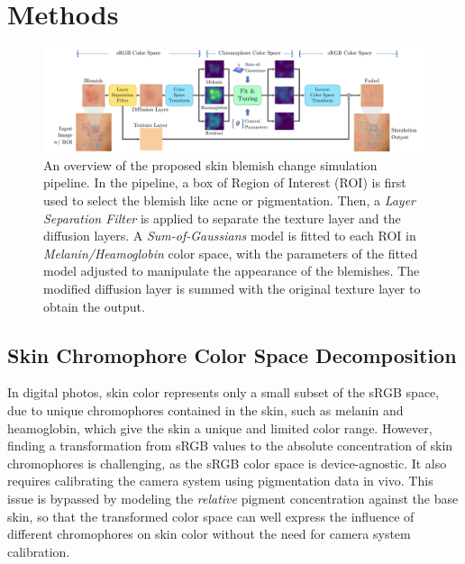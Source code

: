 
\chapter{Methods}
\begin{spacing}{1.5}
\setlength{\parskip}{0.3in}
\begin{figure}[t]
    \centering
    \includegraphics[width=0.94\columnwidth]{Chapter3/system.pdf}
    \caption{An overview of the proposed skin blemish change simulation pipeline. In the pipeline, a box of Region of Interest (ROI) is first used to select the blemish like acne or pigmentation. Then, a \textit{Layer Separation Filter} is applied to separate the texture layer and the diffusion layers. A \textit{Sum-of-Gaussians} model is fitted to each ROI in \textit{Melanin/Heamoglobin} color space, with the parameters of the fitted model adjusted to manipulate the appearance of the blemishes. The modified diffusion layer is summed with the original texture layer to obtain the output.}
    \label{fig:system}
\end{figure}

\section{Skin Chromophore Color Space Decomposition}
In digital photos, skin color represents only a small subset of the sRGB space, due to unique chromophores contained in the skin, such as melanin and heamoglobin, which give the skin a unique and limited color range. However, finding a transformation from sRGB values to the absolute concentration of skin chromophores is challenging, as the sRGB color space is device-agnostic. It also requires calibrating the camera system using pigmentation data in vivo. This issue is bypassed by modeling the \textit{relative} pigment concentration against the base skin, so that the transformed color space can well express the influence of different chromophores on skin color without the need for camera system calibration.


\end{spacing}
